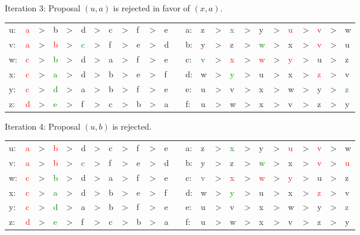 \documentclass{amsart}
\begin{document}
\begin{enumerate}
Iteration 3: Proposal $(u,a)$ is rejected in favor of $(x,a)$.
\begin{center}
\begin{tabular}{LLLLLLLLLLLLL LLLLLLLLLLLL }
u:&\textcolor{red}{a}&>&b&>&d&>&c&>&f&>&e& \quad \quad &a:&z&>&\textcolor{green}{x}&>&y&>&\textcolor{red}{u}&>&\textcolor{red}{v}&>&w\\
v:&\textcolor{red}{a}&>&\textcolor{red}{b}&>&\textcolor{green}{c}&>&f&>&e&>&d& \quad \quad &b:&y&>&z&>&\textcolor{green}{w}&>&x&>&\textcolor{red}{v}&>&u\\
w:&\textcolor{red}{c}&>&\textcolor{green}{b}&>&d&>&a&>&f&>&e& \quad \quad &c:&\textcolor{green}{v}&>&\textcolor{red}{x}&>&\textcolor{red}{w}&>&\textcolor{red}{y}&>&u&>&z\\
x:&\textcolor{red}{c}&>&\textcolor{green}{a}&>&d&>&b&>&e&>&f& \quad \quad &d:&w&>&\textcolor{green}{y}&>&u&>&x&>&\textcolor{red}{z}&>&v\\
y:&\textcolor{red}{c}&>&\textcolor{green}{d}&>&a&>&b&>&f&>&e& \quad \quad &e:&u&>&v&>&x&>&w&>&y&>&\textcolor{green}{z}\\
z:&\textcolor{red}{d}&>&\textcolor{green}{e}&>&f&>&c&>&b&>&a& \quad \quad &f:&u&>&w&>&x&>&v&>&z&>&y\\
\end{tabular}
\end{center}
\vspace{.25in}

Iteration 4: Proposal $(u,b)$ is rejected.
\begin{center}
\begin{tabular}{LLLLLLLLLLLLL LLLLLLLLLLLL }
u:&\textcolor{red}{a}&>&\textcolor{red}{b}&>&d&>&c&>&f&>&e& \quad \quad &a:&z&>&\textcolor{green}{x}&>&y&>&\textcolor{red}{u}&>&\textcolor{red}{v}&>&w\\
v:&\textcolor{red}{a}&>&\textcolor{red}{b}&>&\textcolor{green}{c}&>&f&>&e&>&d& \quad \quad &b:&y&>&z&>&\textcolor{green}{w}&>&x&>&\textcolor{red}{v}&>&\textcolor{red}{u}\\
w:&\textcolor{red}{c}&>&\textcolor{green}{b}&>&d&>&a&>&f&>&e& \quad \quad &c:&\textcolor{green}{v}&>&\textcolor{red}{x}&>&\textcolor{red}{w}&>&\textcolor{red}{y}&>&u&>&z\\
x:&\textcolor{red}{c}&>&\textcolor{green}{a}&>&d&>&b&>&e&>&f& \quad \quad &d:&w&>&\textcolor{green}{y}&>&u&>&x&>&\textcolor{red}{z}&>&v\\
y:&\textcolor{red}{c}&>&\textcolor{green}{d}&>&a&>&b&>&f&>&e& \quad \quad &e:&u&>&v&>&x&>&w&>&y&>&\textcolor{green}{z}\\
z:&\textcolor{red}{d}&>&\textcolor{green}{e}&>&f&>&c&>&b&>&a& \quad \quad &f:&u&>&w&>&x&>&v&>&z&>&y\\
\end{tabular}
\end{center}
\vspace{.25in}


\end{enumerate}
\end{document}
